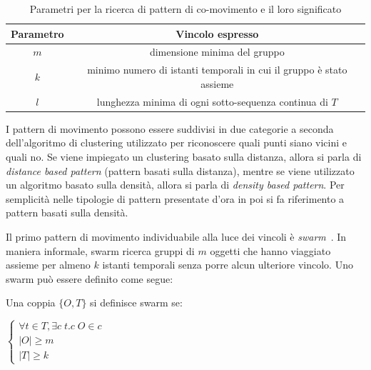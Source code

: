 \begin{table}[H]
    \centering
   \begin{tabular}{||c c||}
 \hline
     Parametro & Vincolo espresso\\ [0.4ex] 
 \hline\hline
     \(m\) & dimensione minima del gruppo \\ 
 \hline
    \(k\) & minimo numero di istanti temporali in cui il gruppo è stato assieme \\ 
 \hline
     \(l\) & lunghezza minima di ogni sotto-sequenza continua di \(T\)\\ 
 \hline
\end{tabular}
    \caption{Parametri per la ricerca di pattern di co-movimento e il loro significato}
    \label{tab:co-movement-pattern}
\end{table}

I pattern di movimento possono essere suddivisi in due categorie a seconda dell'algoritmo di clustering utilizzato per riconoscere quali punti siano vicini e quali no.
Se viene impiegato un clustering basato sulla distanza, allora si parla di \textit{distance based pattern} (pattern basati sulla distanza), mentre se viene utilizzato un algoritmo basato sulla densità, allora si parla di \textit{density based pattern}.
Per semplicità nelle tipologie di pattern presentate d'ora in poi si fa riferimento a pattern basati sulla densità.

Il primo pattern di movimento individuabile alla luce dei vincoli è \textit{swarm}~\cite{li2010swarm}.
In maniera informale, swarm ricerca gruppi di \(m\) oggetti che hanno viaggiato assieme per almeno \(k\) istanti temporali senza porre alcun ulteriore vincolo.
Uno swarm può essere definito come segue:

\begin{definition}[Swarm]\label{definition:swarm}

  Una coppia \( \{ O, T \} \) si definisce swarm se:

  \begin{center}

    \(
      \begin{cases}
         \forall t \in T,\exists c \; t.c \; O \in c \\
         |O| \geq m \\
         |T| \geq k

      \end{cases}
      \)

  \end{center}
\end{definition}


